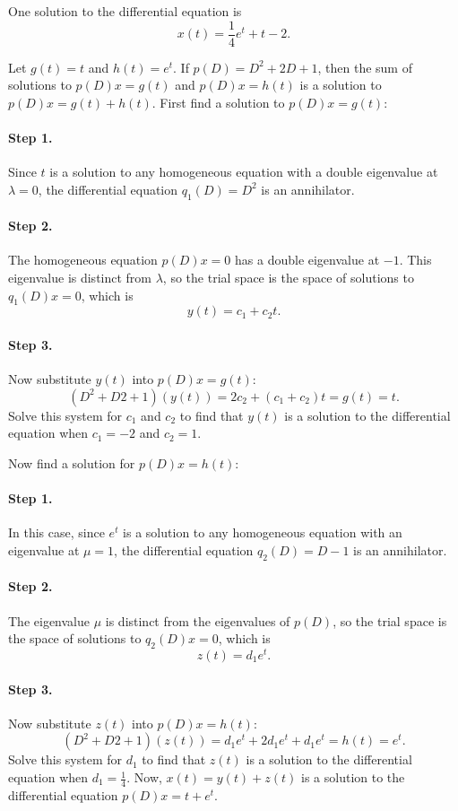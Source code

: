  \ans One solution to the differential equation is
\[
x(t) = \frac{1}{4}e^t + t - 2.
\]

\soln Let $g(t) = t$ and $h(t) = e^t$.  If $p(D) = D^2 + 2D + 1$, then the
sum of solutions to $p(D)x = g(t)$ and $p(D)x = h(t)$ is a solution to
$p(D)x = g(t) + h(t)$.  First find a solution to $p(D)x = g(t)$:

\paragraph{Step 1.} Since $t$ is a solution to any homogeneous equation
with a double eigenvalue at $\lambda = 0$, the differential equation
$q_1(D) = D^2$ is an annihilator.

\paragraph{Step 2.} The homogeneous equation $p(D)x = 0$ has a double
eigenvalue at $-1$.  This eigenvalue is distinct from $\lambda$, so
the trial space is the space of solutions to $q_1(D)x = 0$, which is
\[
y(t) = c_1 + c_2t.
\]
\paragraph{Step 3.} Now substitute $y(t)$ into $p(D)x = g(t)$:
\[
(D^2 + D2 + 1)(y(t)) = 2c_2 + (c_1 + c_2)t = g(t) = t.
\]
Solve this system for $c_1$ and $c_2$ to find that $y(t)$ is a solution to
the differential equation when $c_1 = -2$ and $c_2 = 1$.

\para Now find a solution for $p(D)x = h(t)$:

\paragraph{Step 1.} In this case, since $e^t$ is a solution to any
homogeneous equation with an eigenvalue at $\mu = 1$, the differential
equation $q_2(D) = D - 1$ is an annihilator.

\paragraph{Step 2.} The eigenvalue $\mu$ is distinct from the eigenvalues
of $p(D)$, so the trial space is the space of solutions to $q_2(D)x =
0$, which is
\[
z(t) = d_1e^t.
\]
\paragraph{Step 3.} Now substitute $z(t)$ into $p(D)x = h(t)$:
\[
(D^2 + D2 + 1)(z(t)) = d_1e^t + 2d_1e^t + d_1e^t = h(t) = e^t.
\]
Solve this system for $d_1$ to find that $z(t)$ is a solution to
the differential equation when $d_1 = \frac{1}{4}$.  Now, $x(t) = y(t) + z(t)$
is a solution to the differential equation $p(D)x = t + e^t$.

